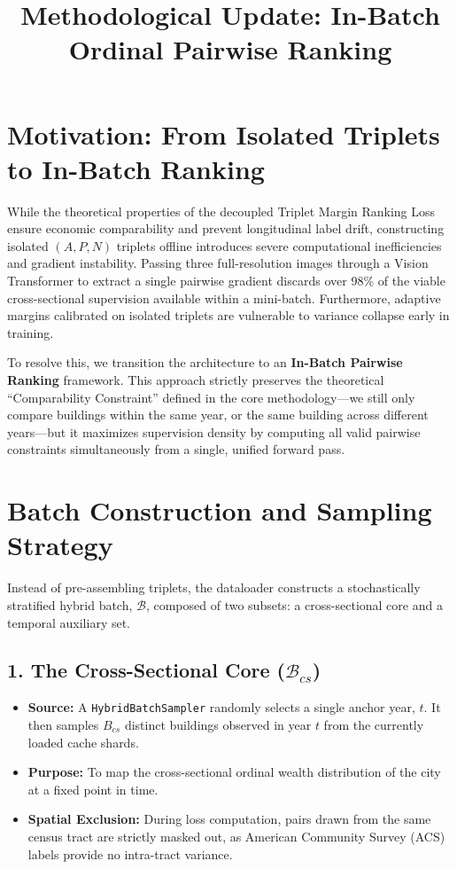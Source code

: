 \documentclass[12pt]{article}
\title{Methodological Update: In-Batch Ordinal Pairwise Ranking}
\author{}
\date{}
\begin{document}
\maketitle

\section{Motivation: From Isolated Triplets to In-Batch Ranking}

While the theoretical properties of the decoupled Triplet Margin Ranking Loss ensure economic comparability and prevent longitudinal label drift, constructing isolated $(A, P, N)$ triplets offline introduces severe computational inefficiencies and gradient instability. Passing three full-resolution images through a Vision Transformer to extract a single pairwise gradient discards over 98\% of the viable cross-sectional supervision available within a mini-batch. Furthermore, adaptive margins calibrated on isolated triplets are vulnerable to variance collapse early in training.

To resolve this, we transition the architecture to an \textbf{In-Batch Pairwise Ranking} framework. This approach strictly preserves the theoretical ``Comparability Constraint'' defined in the core methodology—we still only compare buildings within the same year, or the same building across different years—but it maximizes supervision density by computing all valid pairwise constraints simultaneously from a single, unified forward pass.

\section{Batch Construction and Sampling Strategy}

Instead of pre-assembling triplets, the dataloader constructs a stochastically stratified hybrid batch, $\mathcal{B}$, composed of two subsets: a cross-sectional core and a temporal auxiliary set.

\subsection{1. The Cross-Sectional Core ($\mathcal{B}_{cs}$)}
\begin{itemize}
    \item \textbf{Source:} A \texttt{HybridBatchSampler} randomly selects a single anchor year, $t$. It then samples $B_{cs}$ distinct buildings observed in year $t$ from the currently loaded cache shards.
    \item \textbf{Purpose:} To map the cross-sectional ordinal wealth distribution of the city at a fixed point in time.
    \item \textbf{Spatial Exclusion:} During loss computation, pairs drawn from the same census tract are strictly masked out, as American Community Survey (ACS) labels provide no intra-tract variance.
\end{itemize}
\end{document}
